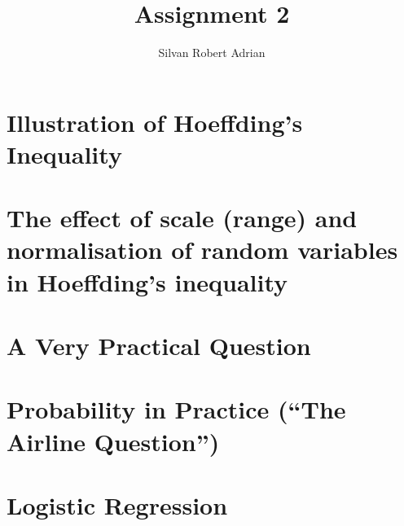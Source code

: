 \documentclass[a4paper]{article}
\title{\vspace{-5cm} Assignment 2}
\author{Silvan Robert Adrian}
\newcommand{\1}{\mathbbm{1}}
\begin{document}
\maketitle

\tableofcontents

\section{Illustration of Hoeffding's Inequality}


\section{The effect of scale (range) and normalisation of random variables in
Hoeffding's inequality}


\section{A Very Practical Question}


\section{Probability in Practice (``The Airline Question'')}


\section{Logistic Regression}

\end{document}

